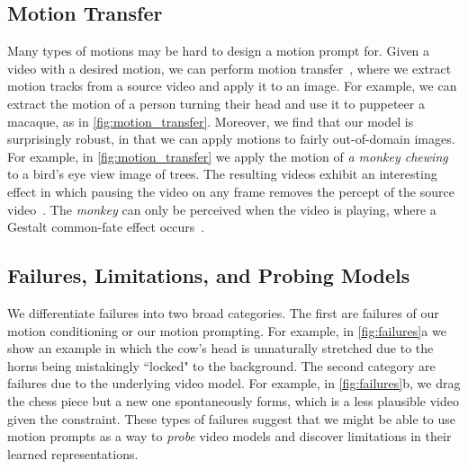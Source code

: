 \subsection{Motion Transfer}
\label{sec:transfer}

Many types of motions may be hard to design a motion prompt for. Given a video with a desired motion, we can perform motion transfer~\cite{2023videocomposer,geng2024motion}, where we extract motion tracks from a source video and apply it to an image. For example, we can extract the motion of a person turning their head and use it to puppeteer a macaque, as in \cref{fig:motion_transfer}. Moreover, we find that our model is surprisingly robust, in that we can apply motions to fairly out-of-domain images. For example, in \cref{fig:motion_transfer} we apply the motion of {\it a monkey chewing} to a bird's eye view image of trees. 
The resulting videos exhibit an interesting effect in which pausing the video on any frame removes the percept of the source video~\cite{reddit2024rickroll}. 
The {\it monkey} can only be perceived when the video is playing, where a Gestalt common-fate effect occurs~\cite{johansson1973visual}.






\subsection{Failures, Limitations, and Probing Models}
\label{sec:failures}
We differentiate failures into two broad categories. The first are failures of our motion conditioning or our motion prompting. For example, in \cref{fig:failures}a we show an example in which the cow's head is unnaturally stretched due to the horns being mistakingly ``locked" to the background. 
The second category are failures due to the underlying video model. 
For example, in \cref{fig:failures}b, we drag the chess piece but a new one spontaneously forms, which is a less plausible video given the constraint. 
These types of failures suggest that we might be able to use motion prompts as a way to {\it probe} video models and discover limitations in their learned representations. 








